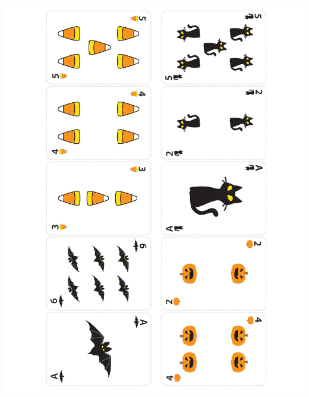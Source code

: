 
    \includegraphics[width=\textwidth,height=\textheight,keepaspectratio, angle =90]{assets/kat/cutouts}
